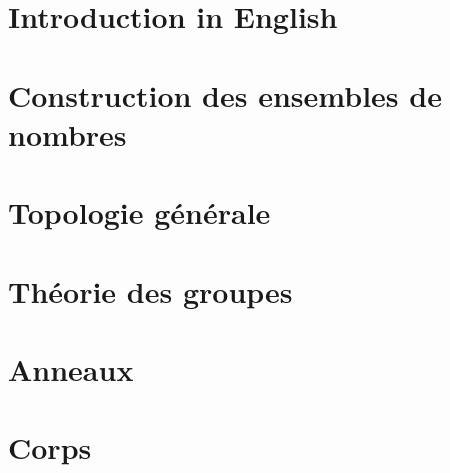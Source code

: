 \chapter*{Introduction in English}




            







\chapter{Construction des ensembles de nombres}


\chapter{Topologie générale}



\chapter{Théorie des groupes}



\chapter{Anneaux}


\chapter{Corps}






